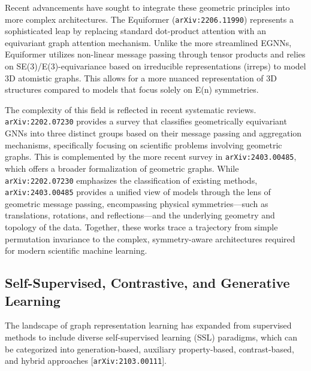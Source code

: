 \documentclass[11pt]{article}
\begin{document}
Recent advancements have sought to integrate these geometric principles into more complex architectures. The Equiformer (\texttt{arXiv:2206.11990}) represents a sophisticated leap by replacing standard dot-product attention with an equivariant graph attention mechanism. Unlike the more streamlined EGNNs, Equiformer utilizes non-linear message passing through tensor products and relies on SE(3)/E(3)-equivariance based on irreducible representations (irreps) to model 3D atomistic graphs. This allows for a more nuanced representation of 3D structures compared to models that focus solely on E(n) symmetries.

The complexity of this field is reflected in recent systematic reviews. \texttt{arXiv:2202.07230} provides a survey that classifies geometrically equivariant GNNs into three distinct groups based on their message passing and aggregation mechanisms, specifically focusing on scientific problems involving geometric graphs. This is complemented by the more recent survey in \texttt{arXiv:2403.00485}, which offers a broader formalization of geometric graphs. While \texttt{arXiv:2202.07230} emphasizes the classification of existing methods, \texttt{arXiv:2403.00485} provides a unified view of models through the lens of geometric message passing, encompassing physical symmetries—such as translations, rotations, and reflections—and the underlying geometry and topology of the data. Together, these works trace a trajectory from simple permutation invariance to the complex, symmetry-aware architectures required for modern scientific machine learning.

\subsection{Self-Supervised, Contrastive, and Generative Learning}

The landscape of graph representation learning has expanded from supervised methods to include diverse self-supervised learning (SSL) paradigms, which can be categorized into generation-based, auxiliary property-based, contrast-based, and hybrid approaches [\texttt{arXiv:2103.00111}].
\end{document}
